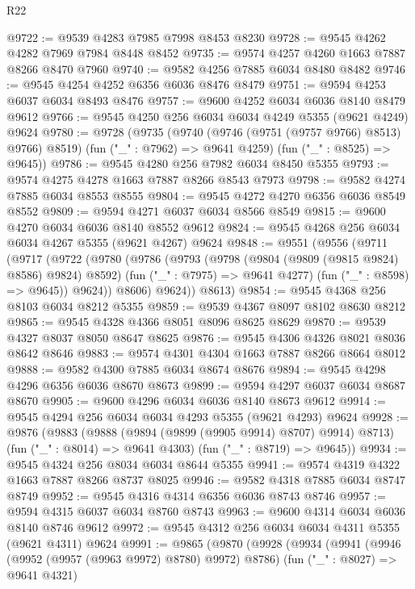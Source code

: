 \begin{lexlean}{R22}
\begin{coremodule}
@9722 := @9539 @4283 @7985 @7998 @8453 @8230
@9728 := @9545 @4262 @4282 @7969 @7984 @8448 @8452
@9735 := @9574 @4257 @4260 @1663 @7887 @8266 @8470 @7960
@9740 := @9582 @4256 @7885 @6034 @8480 @8482
@9746 := @9545 @4254 @4252 @6356 @6036 @8476 @8479
@9751 := @9594 @4253 @6037 @6034 @8493 @8476
@9757 := @9600 @4252 @6034 @6036 @8140 @8479 @9612
@9766 := @9545 @4250 @256 @6034 @6034 @4249 @5355 (@9621 @4249) @9624
@9780 := @9728
    (@9735
      (@9740 (@9746 (@9751 (@9757 @9766) @8513) @9766) @8519)
      (fun ("_" : @7962) => @9641 @4259)
      (fun ("_" : @8525) => @9645))
@9786 := @9545 @4280 @256 @7982 @6034 @8450 @5355
@9793 := @9574 @4275 @4278 @1663 @7887 @8266 @8543 @7973
@9798 := @9582 @4274 @7885 @6034 @8553 @8555
@9804 := @9545 @4272 @4270 @6356 @6036 @8549 @8552
@9809 := @9594 @4271 @6037 @6034 @8566 @8549
@9815 := @9600 @4270 @6034 @6036 @8140 @8552 @9612
@9824 := @9545 @4268 @256 @6034 @6034 @4267 @5355 (@9621 @4267) @9624
@9848 := @9551
    (@9556
      (@9711
        (@9717
          (@9722
            (@9780
              (@9786
                (@9793
                  (@9798 (@9804 (@9809 (@9815 @9824) @8586) @9824) @8592)
                  (fun ("_" : @7975) => @9641 @4277)
                  (fun ("_" : @8598) => @9645))
                @9624))
            @8606)
          @9624))
      @8613)
@9854 := @9545 @4368 @256 @8103 @6034 @8212 @5355
@9859 := @9539 @4367 @8097 @8102 @8630 @8212
@9865 := @9545 @4328 @4366 @8051 @8096 @8625 @8629
@9870 := @9539 @4327 @8037 @8050 @8647 @8625
@9876 := @9545 @4306 @4326 @8021 @8036 @8642 @8646
@9883 := @9574 @4301 @4304 @1663 @7887 @8266 @8664 @8012
@9888 := @9582 @4300 @7885 @6034 @8674 @8676
@9894 := @9545 @4298 @4296 @6356 @6036 @8670 @8673
@9899 := @9594 @4297 @6037 @6034 @8687 @8670
@9905 := @9600 @4296 @6034 @6036 @8140 @8673 @9612
@9914 := @9545 @4294 @256 @6034 @6034 @4293 @5355 (@9621 @4293) @9624
@9928 := @9876
    (@9883
      (@9888 (@9894 (@9899 (@9905 @9914) @8707) @9914) @8713)
      (fun ("_" : @8014) => @9641 @4303)
      (fun ("_" : @8719) => @9645))
@9934 := @9545 @4324 @256 @8034 @6034 @8644 @5355
@9941 := @9574 @4319 @4322 @1663 @7887 @8266 @8737 @8025
@9946 := @9582 @4318 @7885 @6034 @8747 @8749
@9952 := @9545 @4316 @4314 @6356 @6036 @8743 @8746
@9957 := @9594 @4315 @6037 @6034 @8760 @8743
@9963 := @9600 @4314 @6034 @6036 @8140 @8746 @9612
@9972 := @9545 @4312 @256 @6034 @6034 @4311 @5355 (@9621 @4311) @9624
@9991 := @9865
    (@9870
      (@9928
        (@9934
          (@9941
            (@9946 (@9952 (@9957 (@9963 @9972) @8780) @9972) @8786)
            (fun ("_" : @8027) => @9641 @4321)

\end{coremodule}
\end{lexlean}

